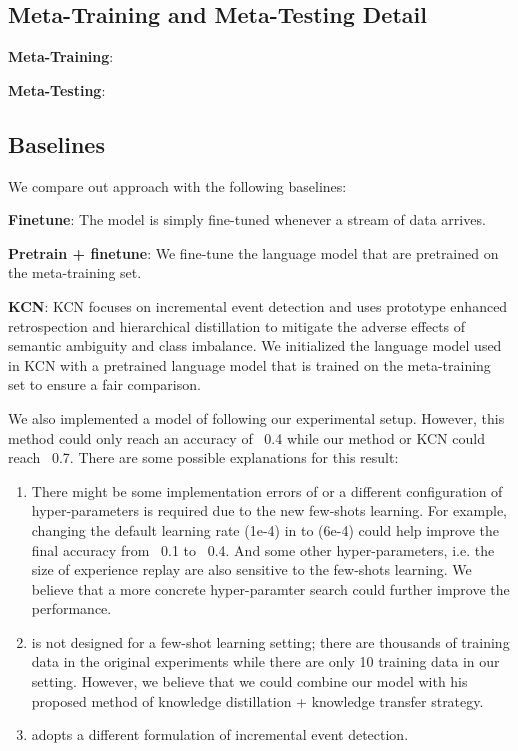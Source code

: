 \subsection{Meta-Training and Meta-Testing Detail}
\textbf{Meta-Training}: 

\noindent
\textbf{Meta-Testing}: 

\subsection{Baselines}
We compare out approach with the following baselines: 

\noindent
\textbf{Finetune}: The model is simply fine-tuned whenever a stream of data arrives.

\noindent
\textbf{Pretrain + finetune}: We fine-tune the language model that are pretrained on the meta-training set. 

\noindent
\textbf{KCN}\citep{cao2020incremental}: KCN focuses on incremental event detection and uses prototype enhanced retrospection and hierarchical distillation to mitigate the adverse effects of semantic ambiguity and class imbalance. We initialized the language model used in KCN with a pretrained language model that is trained on the meta-training set to ensure a fair comparison. 

We also implemented a model of  \cite{yu2021lifelong} following our experimental setup. However, this method could only reach an accuracy of ~0.4 while our method or KCN could reach ~0.7. There are some possible explanations for this result: 
\begin{enumerate}[noitemsep]
\item There might be some implementation errors of  \cite{yu2021lifelong} or a different configuration of hyper-parameters is required due to the new few-shots learning. For example, changing the default learning rate (1e-4)  in  \cite{yu2021lifelong}  to (6e-4) could help improve the final accuracy from ~0.1 to ~0.4. And some other hyper-parameters, i.e. the size of experience replay are also sensitive to the few-shots learning. We believe that a more concrete hyper-paramter search could further improve the performance. 

\item \cite{yu2021lifelong}  is not designed for a few-shot learning setting; there are thousands of  training data in the original experiments while there are only 10 training data in our setting. However, we believe that we could combine our model with his proposed method of knowledge distillation + knowledge transfer strategy. 

\item \cite{yu2021lifelong} adopts a different formulation of incremental event detection.
\end{enumerate}

